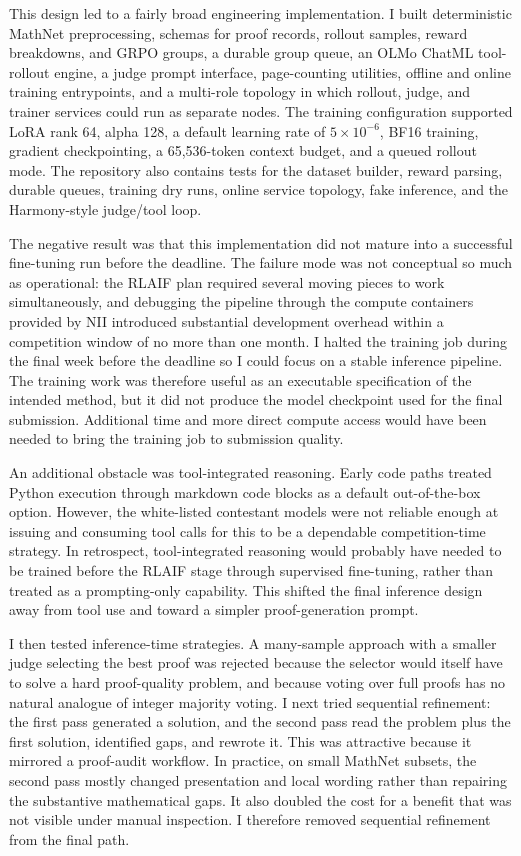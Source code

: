 This design led to a fairly broad engineering implementation. I built deterministic MathNet preprocessing, schemas for proof records, rollout samples, reward breakdowns, and GRPO groups, a durable group queue, an OLMo ChatML tool-rollout engine, a judge prompt interface, page-counting utilities, offline and online training entrypoints, and a multi-role topology in which rollout, judge, and trainer services could run as separate nodes. The training configuration supported LoRA rank 64, alpha 128, a default learning rate of \(5 \times 10^{-6}\), BF16 training, gradient checkpointing, a 65,536-token context budget, and a queued rollout mode. The repository also contains tests for the dataset builder, reward parsing, durable queues, training dry runs, online service topology, fake inference, and the Harmony-style judge/tool loop.

The negative result was that this implementation did not mature into a successful fine-tuning run before the deadline. The failure mode was not conceptual so much as operational: the RLAIF plan required several moving pieces to work simultaneously, and debugging the pipeline through the compute containers provided by NII introduced substantial development overhead within a competition window of no more than one month. I halted the training job during the final week before the deadline so I could focus on a stable inference pipeline. The training work was therefore useful as an executable specification of the intended method, but it did not produce the model checkpoint used for the final submission. Additional time and more direct compute access would have been needed to bring the training job to submission quality.

An additional obstacle was tool-integrated reasoning. Early code paths treated Python execution through markdown code blocks as a default out-of-the-box option. However, the white-listed contestant models were not reliable enough at issuing and consuming tool calls for this to be a dependable competition-time strategy. In retrospect, tool-integrated reasoning would probably have needed to be trained before the RLAIF stage through supervised fine-tuning, rather than treated as a prompting-only capability. This shifted the final inference design away from tool use and toward a simpler proof-generation prompt.

I then tested inference-time strategies. A many-sample approach with a smaller judge selecting the best proof was rejected because the selector would itself have to solve a hard proof-quality problem, and because voting over full proofs has no natural analogue of integer majority voting. I next tried sequential refinement: the first pass generated a solution, and the second pass read the problem plus the first solution, identified gaps, and rewrote it. This was attractive because it mirrored a proof-audit workflow. In practice, on small MathNet subsets, the second pass mostly changed presentation and local wording rather than repairing the substantive mathematical gaps. It also doubled the cost for a benefit that was not visible under manual inspection. I therefore removed sequential refinement from the final path.

